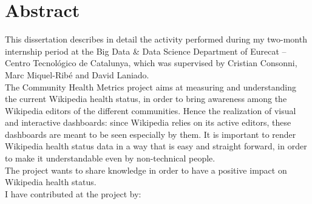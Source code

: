\chapter*{Abstract} %
\label{sommario}


This dissertation describes in detail the activity performed during my two-month internship period at the Big Data \& Data Science Department of Eurecat – Centro Tecnológico de Catalunya, which was supervised by Cristian Consonni, Marc Miquel-Ribé and David Laniado.\\
The Community Health Metrics project aims at measuring and understanding the current Wikipedia health status, in order to bring awareness among the Wikipedia editors of the different communities.
Hence the realization of visual and interactive dashboards: since Wikipedia relies on its active editors, these dashboards are meant to be seen especially by them. It is important to render Wikipedia health status data in a way that is easy and straight forward, in order to make it understandable even by non-technical people.\\
The project wants to share knowledge in order to have a positive impact on Wikipedia health status.\\
I have contributed at the project by:

